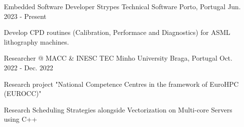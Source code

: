 
\begin{cventries}


\cventry
{Embedded Software Developer} %
{Strypes Technical Software} %
{Porto, Portugal} %
{Jun. 2023 - Present} %
{ %
\begin{cvitems}
\item{Develop CPD routines (Calibration, Performace and Diagnostics) for ASML
  lithography machines.}
\end{cvitems}
}

\cventry
{Researcher @ MACC \& INESC TEC} %
{Minho University} %
{Braga, Portugal} %
{Oct. 2022 - Dec. 2022} %
{ %
\begin{cvitems}
\item{Research project "National Competence Centres in the framework of EuroHPC (EUROCC)"}
\item{Research Scheduling Strategies alongside Vectorization on Multi-core
  Servers using C++}
\end{cvitems}
}

\end{cventries}
